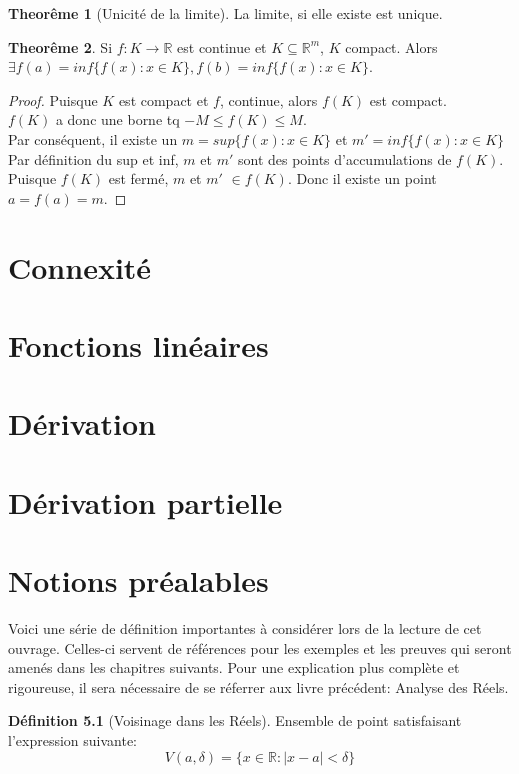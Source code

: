 \documentclass[12pt]{book}
\let\Bbb\mathbb
\theoremstyle{definition}
\newtheorem{definition}{Définition}[section]
\newtheorem{theorem}{Theorême}[section]
\begin{document}
\begin{theorem}[Unicité de la limite]
    \label{thm:limite_unique}
    La limite, si elle existe est unique.
\end{theorem}

\begin{theorem}
    Si $f: K \to \Bbb R$ est continue et $K \subseteq \Bbb R^m$, $K$ compact. Alors $\exists f(a) = inf\{f(x) : x \in K\}, f(b) = inf\{f(x) : x \in K\}$.
\end{theorem}


\begin{proof}
    Puisque $K$ est compact et $f$, continue, alors $f(K)$ est compact.\\
    $f(K)$ a donc une borne tq $-M \leq f(K) \leq M$.\\
    Par conséquent, il existe un $m = sup\{f(x): x \in K\}$ et $m' = inf\{f(x): x \in K\}$\\
    Par définition du sup et inf, $m$ et  $m'$ sont des points d'accumulations de $f(K)$.\\
    Puisque $f(K)$ est fermé, $m$ et $m'$ $\in f(K)$. Donc il existe un point $a = f(a) = m$.
\end{proof}

\chapter{Connexité}
\chapter{Fonctions linéaires}
\chapter{Dérivation}
\chapter{Dérivation partielle}
\appendix
\chapter{Notions préalables}
Voici une série de définition importantes à considérer lors de la lecture de cet ouvrage. Celles-ci servent
de références pour les exemples et les preuves qui seront amenés dans les chapitres suivants. Pour une explication
plus complète et rigoureuse, il sera nécessaire de se réferrer aux livre précédent: Analyse des Réels.

\begin{definition}[Voisinage dans les Réels]
    \label{def:voisinage_reels}
    Ensemble de point satisfaisant l'expression
    suivante: $$V(a, \delta) = \{ x \in \Bbb R : |x - a| < \delta \}$$
\end{definition}
\end{document}
